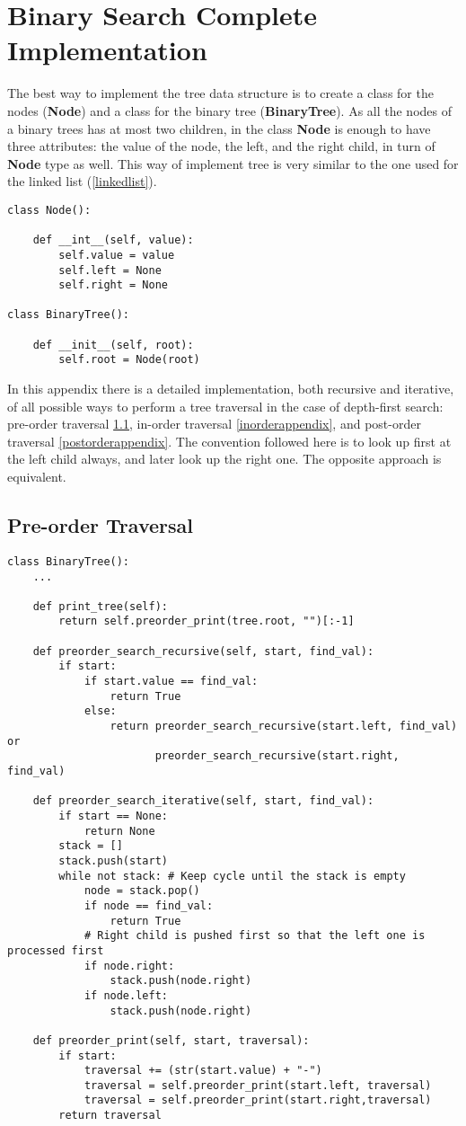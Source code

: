 \chapter{Binary Search Complete Implementation}
\label{binappendix}
The best way to implement the tree data structure is to create a class for the nodes (\textbf{Node}) and a class for the binary tree (\textbf{BinaryTree}). As all the nodes of a binary trees has at most two children, in the class \textbf{Node} is enough to have three attributes: the value of the node, the left, and the right child, in turn of \textbf{Node} type as well. This way of implement tree is very similar to the one used for the linked list (\ref{linkedlist}).

\begin{lstlisting}[firstnumber=1, caption={Class definition for a node and a tree.}]
class Node():

	def __int__(self, value):
		self.value = value
		self.left = None
		self.right = None

class BinaryTree():

	def __init__(self, root):
		self.root = Node(root)
\end{lstlisting}

In this appendix there is a detailed implementation, both recursive and iterative, of all possible ways to perform a tree traversal in the case of depth-first search: pre-order traversal \ref{preorderappendix}, in-order traversal \ref{inorderappendix}, and post-order traversal \ref{postorderappendix}. The convention followed here is to look up first at the left child always, and later look up the right one. The opposite approach is equivalent.

\section{Pre-order Traversal}
\label{preorderappendix}

\begin{lstlisting}[firstnumber=1, caption={Recursive and iterative implementation of pre-order traversal.}]
class BinaryTree():
	...

	def print_tree(self):
		return self.preorder_print(tree.root, "")[:-1]

	def preorder_search_recursive(self, start, find_val):
		if start:
			if start.value == find_val:
				return True
			else:
				return preorder_search_recursive(start.left, find_val) or
					   preorder_search_recursive(start.right, find_val)

	def preorder_search_iterative(self, start, find_val):
		if start == None:
			return None
		stack = []
		stack.push(start)
		while not stack: # Keep cycle until the stack is empty
			node = stack.pop()
			if node == find_val:
				return True
			# Right child is pushed first so that the left one is processed first
			if node.right:
				stack.push(node.right)
			if node.left:
				stack.push(node.right)

	def preorder_print(self, start, traversal):
		if start:
			traversal += (str(start.value) + "-")
			traversal = self.preorder_print(start.left, traversal)
			traversal = self.preorder_print(start.right,traversal)
		return traversal
\end{lstlisting}

